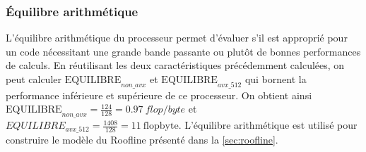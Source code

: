     \subsubsection{Équilibre arithmétique}
        L'équilibre arithmétique du processeur permet d'évaluer s'il est approprié pour un code nécessitant une grande bande passante ou plutôt de bonnes performances de calculs. En réutilisant les deux caractéristiques précédemment calculées, on peut calculer $\text{EQUILIBRE}_{non\_avx}$ et $\text{EQUILIBRE}_{avx\_512}$ qui bornent la performance inférieure et supérieure de ce processeur. On obtient ainsi $\text{EQUILIBRE}_{non\_avx} = \frac{124}{128} = 0.97\ flop/byte$ et $EQUILIBRE_{avx\_512} = \frac{1408}{128} = 11\ \text{flopbyte}$. L'équilibre arithmétique est utilisé pour construire le modèle du Roofline présenté dans la \autoref{sec:roofline}.